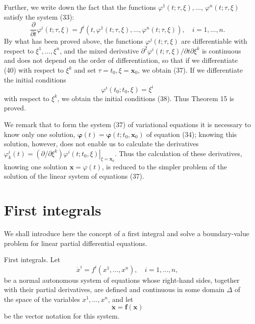 \documentclass[10pt,a5paper]{book}
\makeatletter
\theoremstyle{plain}
\theoremstyle{definition}
\theoremstyle{remark}
\renewenvironment{proof}[1][\proofname]{\par
  \pushQED{\qed}%
  \normalfont\topsep6\p@\@plus6\p@\relax
  \trivlist
  \item\relax{\itshape #1\@addpunct{.}}\hspace\labelsep\ignorespaces
}{\popQED\endtrivlist\@endpefalse}
\makeatother
\begin{document}
\begin{proof}
Further, we write down the fact that the functions $\varphi^{1}(t ; \tau, \xi), \ldots$, $\varphi^{n}(t ; \tau, \xi)$ satisfy the system (33):
\begin{equation*}
\frac{\partial}{\partial t} \varphi^{i}(t ; \tau, \xi)=f^{i}\left(t, \varphi^{1}(t ; \tau, \xi), \ldots, \varphi^{n}(t ; \tau, \xi)\right), \quad i=1, \ldots, n . \tag{40}
\end{equation*}
By what has been proved above, the functions $\varphi^{j}(t ; \tau, \xi)$ are differentiable with respect to $\xi^{1}, \ldots, \xi^{n}$, and the mixed derivative $\partial^{2} \varphi^{i}(t ; \tau, \xi) / \partial t \partial \xi^{k}$ is continuous and does not depend on the order of differentiation, so that if we differentiate (40) with respect to $\xi^{k}$ and set $\tau=t_{0}, \xi=\mathbf{x}_{0}$, we obtain (37). If we differentiate the initial conditions
\[
\varphi^{i}\left(t_{0} ; t_{0}, \xi\right)=\xi^{i}
\]
with respect to $\xi^{k}$, we obtain the initial conditions (38). Thus Theorem 15 is proved.
\end{proof}

We remark that to form the system (37) of variational equations it is necessary to know only one solution, $\boldsymbol{\varphi}(t)=\boldsymbol{\varphi}\left(t ; t_{0}, \mathbf{x}_{0}\right)$ of equation (34); knowing this solution, however, does not enable us to calculate the derivatives $\varphi_{k}^{i}(t)=\left.\left(\partial / \partial \xi^{k}\right) \varphi^{i}\left(t ; t_{0}, \xi\right)\right|_{\xi=\mathbf{x}_{0}}$. Thus the calculation of these derivatives, knowing one solution $\mathbf{x}=\varphi(t)$, is reduced to the simpler problem of the solution of the linear system of equations (37).

\section{First integrals}
We shall introduce here the concept of a first integral and solve a boundary-value problem for linear partial differential equations.

First integrals. Let
\begin{equation*}
\dot{x}^{i}=f^{i}\left(x^{1}, \ldots, x^{n}\right), \quad i=1, \ldots, n, \tag{1}
\end{equation*}
be a normal autonomous system of equations whose right-hand sides, together with their partial derivatives, are defined and continuous in some domain $\Delta$ of the space of the variables $x^{1}, \ldots, x^{n}$, and let
\begin{equation*}
\dot{\mathbf{x}}=\mathbf{f}(\mathbf{x}) \tag{2}
\end{equation*}
be the vector notation for this system.
\end{document}
